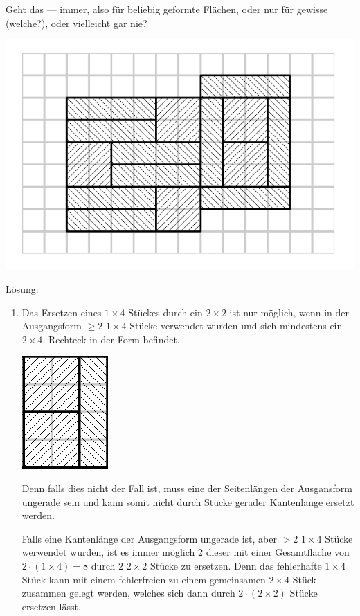 \documentclass[../main.tex]{subfiles}
\begin{document}
\begin{enumerate}
	      Geht das — immer, also für beliebig geformte Flächen,
	      oder nur für gewisse (welche?), oder vielleicht gar nie?
	      \begin{center}
		      \includegraphics[scale=0.5]{tiles}
	      \end{center}

	      Lösung:
	      \begin{enumerate}
		      \item Das Ersetzen eines \( 1 \times 4 \) Stückes durch ein \( 2 \times 2 \) ist nur möglich, wenn in der
				Ausgangsform \( \geq 2 \) \( 1 \times 4 \) Stücke verwendet wurden und sich mindestens ein \( 2 \times 4 \).
				Rechteck in der Form befindet.
		            \begin{center}
			            \includegraphics[scale=0.5]{tiles_small}
		            \end{center}
		            Denn falls dies nicht der Fall ist, muss eine der Seitenlängen der Ausgansform ungerade sein und kann somit
		            nicht durch Stücke gerader Kantenlänge ersetzt werden.

		            Falls eine Kantenlänge der Ausgangsform ungerade ist, aber \( > 2 \) \( 1 \times 4 \) Stücke werwendet wurden,
		            ist es immer möglich \( 2 \) dieser mit einer Gesamtfläche von \( 2 \cdot (1 \times 4) = 8 \) durch \( 2 \) \( 2 \times 2  \)
		            Stücke zu ersetzen. Denn das fehlerhafte \( 1 \times 4 \) Stück kann mit einem fehlerfreien zu einem
		            gemeinsamen \( 2 \times 4 \) Stück zusammen gelegt werden,
		            welches sich dann durch \( 2 \cdot (2 \times 2) \) Stücke ersetzen lässt.
	      \end{enumerate}
\end{enumerate}
\end{document}
